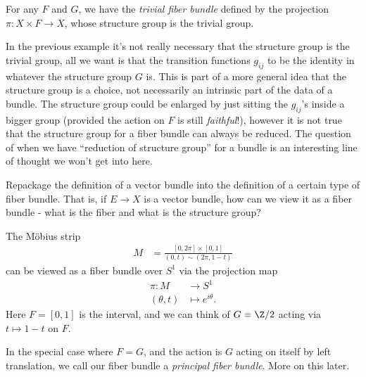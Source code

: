 \documentclass[11pt]{book}
\begin{document}
\begin{example} For any $F$ and $G$, we have the \emph{trivial fiber bundle} defined by the projection $\pi \colon X \times F \to X$, whose structure group is the trivial group.
\end{example}

\begin{remark} In the previous example it's not really necessary that the structure group is the trivial group, all we want is that the transition functions $g_{ij}$ to be the identity in whatever the structure group $G$ is. This is part of a more general idea that the structure group is a choice, not necessarily an intrinsic part of the data of a bundle. The structure group could be enlarged by just sitting the $g_{ij}$'s inside a bigger group (provided the action on $F$ is still \emph{faithful}!), however it is not true that the structure group for a fiber bundle can always be reduced. The question of when we have ``reduction of structure group'' for a bundle is an interesting line of thought we won't get into here.
\end{remark}

\begin{exercise} Repackage the definition of a vector bundle into the definition of a certain type of fiber bundle. That is, if $E \to X$ is a vector bundle, how can we view it as a fiber bundle - what is the fiber and what is the structure group?
\end{exercise}




\begin{example} The M\"{o}bius strip
\begin{align*}
    M &= \frac{[0,2\pi] \times [0,1]}{(0,t)\sim (2\pi,1-t)}
\end{align*}
can be viewed as a fiber bundle over $S^1$ via the projection map
\begin{align*}
    \pi \colon M &\to S^1 \\
    (\theta,t) &\mapsto e^{i \theta}.
\end{align*}
Here $F = [0,1]$ is the interval, and we can think of $G = \Z/2$ acting via $t \mapsto 1-t$ on $F$.
\end{example}

\begin{example} In the special case where $F = G$, and the action is $G$ acting on itself by left translation, we call our fiber bundle a \emph{principal fiber bundle}. More on this later.
\end{example}
\end{document}
